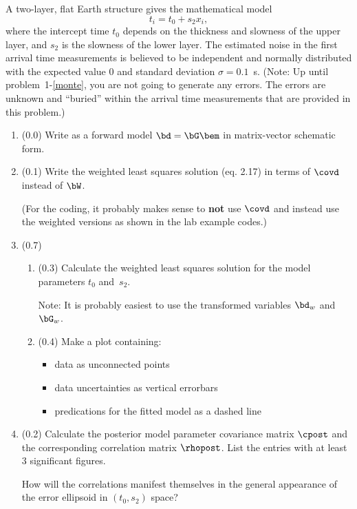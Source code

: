 \documentclass[11pt,titlepage,fleqn]{article}
\begin{document}
A two-layer, flat Earth structure gives the mathematical model
%
\begin{equation}
t_i = t_0 + s_2x_i,
\label{twolayer}
\end{equation}
%
where the intercept time $t_0$ depends on the thickness and slowness of the upper layer, and $s_2$ is the slowness of the lower layer. The estimated noise in the first arrival time measurements is believed to be independent and normally distributed with the expected value 0 and standard deviation $\sigma = 0.1$~s. (Note: Up until problem~1-\ref{monte}, you are not going to generate any errors. The errors are unknown and ``buried'' within the arrival time measurements that are provided in this problem.)
%
\begin{enumerate}
\item (0.0) Write  as a forward model $\bd = \bG\bem$ in matrix-vector schematic form.

\item (0.1) Write the weighted least squares solution (eq. 2.17) in terms of $\covd$ instead of $\bW$.

(For the coding, it probably makes sense to {\bf not} use $\covd$ and instead use the weighted versions as shown in the lab example codes.)

\item (0.7) 
\begin{enumerate}
\item (0.3) Calculate the weighted least squares solution for the model parameters $t_0$ and~$s_2$.

Note: It is probably easiest to use the transformed variables $\bd_w$ and $\bG_w$.
\item (0.4) Make a plot containing:
%
\begin{itemize}
\item data as unconnected points
\item data uncertainties as vertical errorbars
\item predications for the fitted model as a dashed line
\end{itemize}

\end{enumerate}


\item (0.2) Calculate the posterior model parameter covariance matrix $\cpost$ and the corresponding correlation matrix $\rhopost$. List the entries with at least 3 significant figures.

How will the correlations manifest themselves in the general appearance of the error ellipsoid in $(t_0,s_2)$ space?


\end{enumerate}
\end{document}
